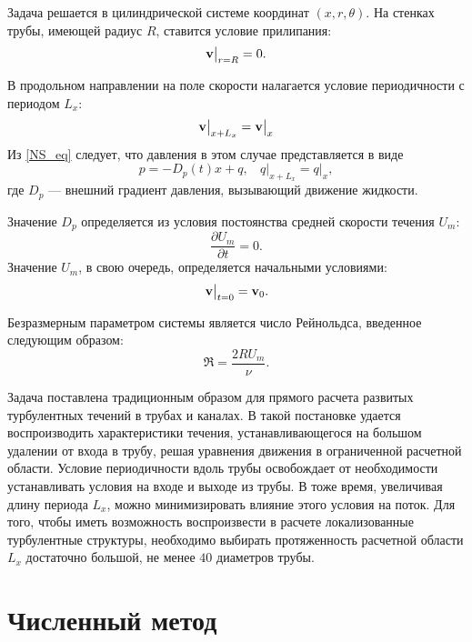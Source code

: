 Задача решается в цилиндрической системе координат $(x,r,\theta)$. На стенках трубы, имеющей радиус $R$, ставится условие прилипания:
\begin{equation} \label{bc1_eq}
\mathbf{v} \big|_{r=R} = 0.
\end{equation}

В продольном направлении на поле скорости налагается условие периодичности с периодом $L_x$:
\begin{equation} \label{bc2_eq}
\mathbf{v} \big|_{x+L_x} = \mathbf{v} \big|_{x}
\end{equation}
Из \eqref{NS_eq} следует, что давления в этом случае представляется в виде
\begin{equation} \label{bc3_eq}
p = - D_p(t)x + q, \ \ \ \  q\big|_{x+L_x} = q\big|_{x},
\end{equation}
где $D_p$ --- внешний градиент давления, вызывающий движение жидкости. 

Значение $D_p$ определяется из условия постоянства средней скорости течения $U_m$: 
\begin{equation} \label{Q_eq}
\frac{\partial U_m}{\partial t} = 0.
\end{equation}
Значение $U_m$, в свою очередь, определяется начальными условиями:
\begin{equation} \label{ic_eq}
\mathbf{v} \big| _{t = 0} = \mathbf{v}_0. 
\end{equation}

Безразмерным параметром системы является число Рейнольдса, введенное следующим образом:
\begin{equation} \label{Re_eq}
\Re = \frac{2 R U_m}{\nu}. 
\end{equation}

Задача поставлена традиционным образом для прямого расчета развитых турбулентных течений в трубах и каналах. В такой постановке удается воспроизводить характеристики течения, устанавливающегося на большом удалении от входа в трубу, решая уравнения движения в ограниченной расчетной области. Условие периодичности вдоль трубы освобождает от необходимости устанавливать условия на входе и выходе из трубы. В тоже время, увеличивая длину периода $L_x$, можно минимизировать влияние этого условия на поток. Для того, чтобы иметь возможность воспроизвести в расчете локализованные турбулентные структуры, необходимо выбирать протяженность расчетной области $L_x$ достаточно большой, не менее $40$ диаметров трубы. 


\section{Численный метод} \label{num_method}

